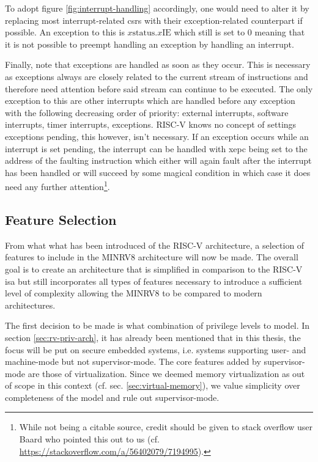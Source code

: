 To adopt figure \ref{fig:interrupt-handling} accordingly, one would need to alter it by replacing most interrupt-related \glspl{csr} with their exception-related counterpart if possible.
An exception to this is $ x\text{status}.x\text{IE} $ which still is set to 0 meaning that it is not possible to preempt handling an exception by handling an interrupt.

Finally, note that exceptions are handled as soon as they occur.
This is necessary as exceptions always are closely related to the current stream of instructions and therefore need attention before said stream can continue to be executed.
The only exception to this are other interrupts which are handled before any exception with the following decreasing order of priority: external interrupts, software interrupts, timer interrupts, exceptions.
RISC-V knows no concept of settings exceptions pending, this however, isn't necessary.
If an exception occurs while an interrupt is set pending, the interrupt can be handled with \gls{xepc} being set to the address of the faulting instruction which either will again fault after the interrupt has been handled or will succeed by some magical condition in which case it does need any further attention\footnote{
    While not being a citable source, credit should be given to stack overflow user Baard who pointed this out to us (cf. \url{https://stackoverflow.com/a/56402079/7194995}).
}.

\subsection{Feature Selection}
\label{sec:risc-v-selection}

From what what has been introduced of the RISC-V architecture, a selection of features to include in the MINRV8 architecture will now be made.
The overall goal is to create an architecture that is simplified in comparison to the RISC-V \gls{isa} but still incorporates all types of features necessary to introduce a sufficient level of complexity allowing the MINRV8 to be compared to modern architectures.

The first decision to be made is what combination of privilege levels to model.
In section \ref{sec:rv-priv-arch}, it has already been mentioned that in this thesis, the focus will be put on secure embedded systems, i.e. systems supporting user- and machine-mode but not supervisor-mode.
The core features added by supervisor-mode are those of virtualization.
Since we deemed memory virtualization as out of scope in this context (cf. sec. \ref{sec:virtual-memory}), we value simplicity over completeness of the model and rule out supervisor-mode.

